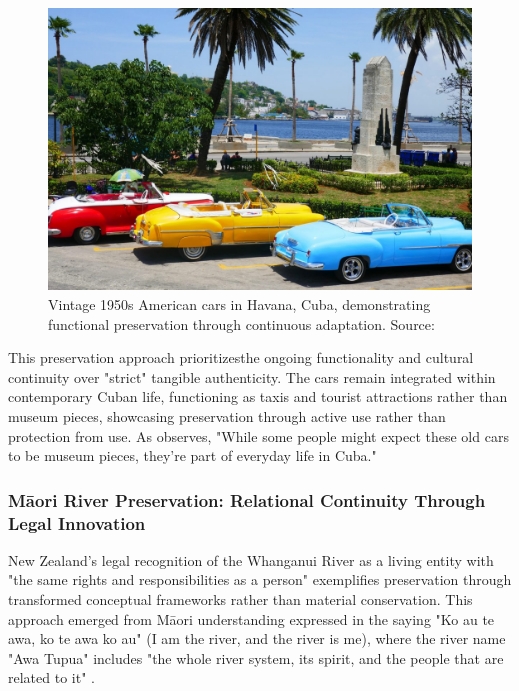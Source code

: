 \begin{figure}[H]
\centering
\includegraphics[width=1\textwidth]{figures/chapter2/vintage_autos_havana.jpeg}
\caption{Vintage 1950s American cars in Havana, Cuba, demonstrating functional preservation through continuous adaptation. Source: \citet{zerobyte2018}}
\label{fig:vintage_cars_havana}
\end{figure}

This preservation approach prioritizesthe ongoing functionality and cultural continuity over "strict" tangible authenticity. The cars remain integrated within contemporary Cuban life, functioning as taxis and tourist attractions rather than museum pieces, showcasing preservation through active use rather than protection from use. As \citet{adewale2024} observes, "While some people might expect these old cars to be museum pieces, they're part of everyday life in Cuba."

\subsubsection{Māori River Preservation: Relational Continuity Through Legal Innovation}

New Zealand's legal recognition of the Whanganui River as a living entity with "the same rights and responsibilities as a person" \citep{paremata2017} exemplifies preservation through transformed conceptual frameworks rather than material conservation. This approach emerged from Māori understanding expressed in the saying "Ko au te awa, ko te awa ko au" (I am the river, and the river is me), where the river name "Awa Tupua" includes "the whole river system, its spirit, and the people that are related to it" \citep{nationallibrarynz2017}.

